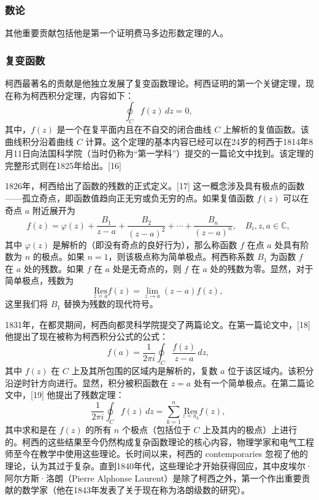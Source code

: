 \subsubsection{数论}  
其他重要贡献包括他是第一个证明费马多边形数定理的人。
\subsubsection{复变函数}  
柯西最著名的贡献是他独立发展了复变函数理论。柯西证明的第一个关键定理，现在称为柯西积分定理，内容如下：
\[
\oint_{C} f(z) \, dz = 0,~
\]
其中，\( f(z) \) 是一个在复平面内且在不自交的闭合曲线 \( C \) 上解析的复值函数。该曲线积分沿着曲线 \( C \) 计算。这个定理的基本内容已经可以在24岁的柯西于1814年8月11日向法国科学院（当时仍称为“第一学科”）提交的一篇论文中找到。该定理的完整形式则在1825年给出。[16]

1826年，柯西给出了函数的残数的正式定义。[17] 这一概念涉及具有极点的函数——孤立奇点，即函数值趋向正无穷或负无穷的点。如果复值函数 \( f(z) \) 可以在奇点 \( a \) 附近展开为
\[
f(z) = \varphi(z) + \frac{B_1}{z-a} + \frac{B_2}{(z-a)^2} + \cdots + \frac{B_n}{(z-a)^n}, \quad B_i, z, a \in \mathbb{C},~
\]
其中 \( \varphi(z) \) 是解析的（即没有奇点的良好行为），那么称函数 \( f \) 在点 \( a \) 处具有阶数为 \( n \) 的极点。如果 \( n = 1 \)，则该极点称为简单极点。柯西称系数 \( B_1 \) 为函数 \( f \) 在 \( a \) 处的残数。如果 \( f \) 在 \( a \) 处是无奇点的，则 \( f \) 在 \( a \) 处的残数为零。显然，对于简单极点，残数为
\[
\underset{z=a}{\mathrm{Res}} f(z) = \lim_{z \to a} (z-a) f(z),~
\]
这里我们将 \( B_1 \) 替换为残数的现代符号。

1831年，在都灵期间，柯西向都灵科学院提交了两篇论文。在第一篇论文中，[18] 他提出了现在被称为柯西积分公式的公式：
\[
f(a) = \frac{1}{2\pi i} \oint_C \frac{f(z)}{z-a} \, dz,~
\]
其中 \( f(z) \) 在 \( C \) 上及其所包围的区域内是解析的，复数 \( a \) 位于该区域内。该积分沿逆时针方向进行。显然，积分被积函数在 \( z = a \) 处有一个简单极点。在第二篇论文中，[19] 他提出了残数定理：
\[
\frac{1}{2\pi i} \oint_C f(z) \, dz = \sum_{k=1}^{n} \underset{z = a_k}{\mathrm{Res}} f(z),~
\]
其中求和是在 \( f(z) \) 的所有 \( n \) 个极点（包括位于 \( C \) 上及其内的极点）上进行的。柯西的这些结果至今仍然构成复杂函数理论的核心内容，物理学家和电气工程师至今在教学中使用这些理论。长时间以来，柯西的 contemporaries 忽视了他的理论，认为其过于复杂。直到1840年代，这些理论才开始获得回应，其中皮埃尔·阿尔方斯·洛朗（Pierre Alphonse Laurent）是除了柯西之外，第一个作出重要贡献的数学家（他在1843年发表了关于现在称为洛朗级数的研究）。
